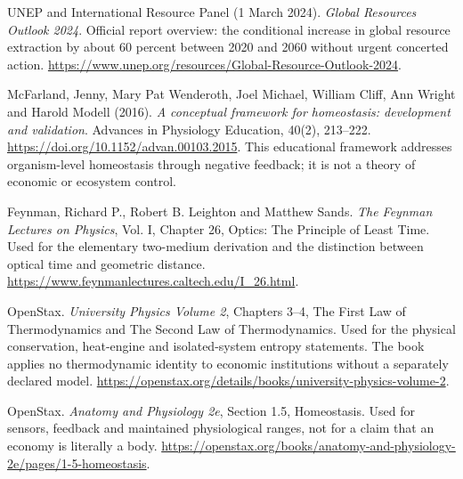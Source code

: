  UNEP and International Resource Panel
(1 March 2024). \textit{Global Resources Outlook 2024}. Official report
overview: the conditional increase in global resource extraction by about
60 percent between 2020 and 2060 without urgent concerted action.
\url{https://www.unep.org/resources/Global-Resource-Outlook-2024}.

 McFarland, Jenny, Mary Pat Wenderoth,
Joel Michael, William Cliff, Ann Wright and Harold Modell (2016).
\textit{A conceptual framework for homeostasis: development and validation}.
Advances in Physiology Education, 40(2), 213--222.
\url{https://doi.org/10.1152/advan.00103.2015}.
This educational framework addresses organism-level homeostasis through
negative feedback; it is not a theory of economic or ecosystem control.

 Feynman, Richard P., Robert B. Leighton and Matthew
Sands. \textit{The Feynman Lectures on Physics}, Vol. I, Chapter 26,
Optics: The Principle of Least Time. Used for the elementary two-medium
derivation and the distinction between optical time and geometric distance.
\url{https://www.feynmanlectures.caltech.edu/I_26.html}.

 OpenStax. \textit{University Physics Volume 2},
Chapters 3--4, The First Law of Thermodynamics and The Second Law of
Thermodynamics. Used for the physical conservation, heat-engine and
isolated-system entropy statements. The book applies no thermodynamic
identity to economic institutions without a separately declared model.
\url{https://openstax.org/details/books/university-physics-volume-2}.

 OpenStax. \textit{Anatomy and Physiology 2e},
Section 1.5, Homeostasis. Used for sensors, feedback and maintained
physiological ranges, not for a claim that an economy is literally a body.
\url{https://openstax.org/books/anatomy-and-physiology-2e/pages/1-5-homeostasis}.
